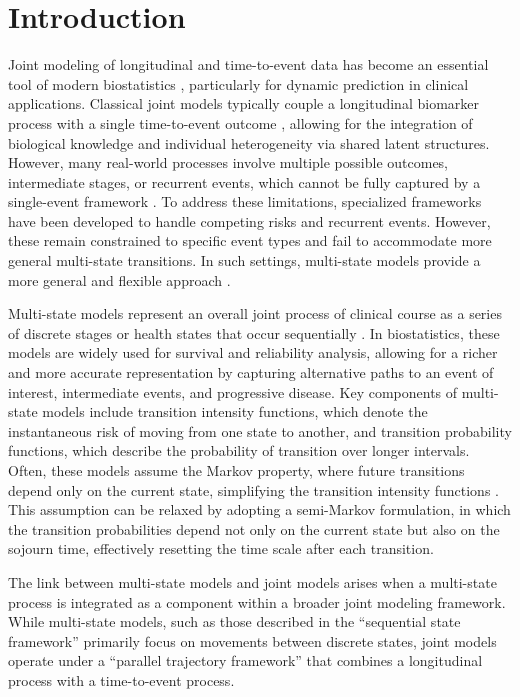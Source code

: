 \documentclass{sn-jnl}
\begin{document}
\section{Introduction} \label{sec:introduction}

Joint modeling of longitudinal and time-to-event data has become an essential tool of modern biostatistics \citep{papageorgiou2019overview}, particularly for dynamic prediction in clinical applications. Classical joint models typically couple a longitudinal biomarker process with a single time-to-event outcome \citep{rizopoulos2012joint}, allowing for the integration of biological knowledge and individual heterogeneity via shared latent structures. However, many real-world processes involve multiple possible outcomes, intermediate stages, or recurrent events, which cannot be fully captured by a single-event framework \citep{KrolMauguen2017}. To address these limitations, specialized frameworks have been developed to handle competing risks and recurrent events. However, these remain constrained to specific event types and fail to accommodate more general multi-state transitions. In such settings, multi-state models provide a more general and flexible approach \citep{ferrer2016joint, you2024joint}.

Multi-state models represent an overall joint process of clinical course as a series of discrete stages or health states that occur sequentially \citep{lovblom2024modeling}. In biostatistics, these models are widely used for survival and reliability analysis, allowing for a richer and more accurate representation by capturing alternative paths to an event of interest, intermediate events, and progressive disease. Key components of multi-state models include transition intensity functions, which denote the instantaneous risk of moving from one state to another, and transition probability functions, which describe the probability of transition over longer intervals. Often, these models assume the Markov property, where future transitions depend only on the current state, simplifying the transition intensity functions \citep{asanjarani2022estimation}. This assumption can be relaxed by adopting a semi-Markov formulation, in which the transition probabilities depend not only on the current state but also on the sojourn time, effectively resetting the time scale after each transition.

The link between multi-state models and joint models arises when a multi-state process is integrated as a component within a broader joint modeling framework. While multi-state models, such as those described in the ``sequential state framework'' primarily focus on movements between discrete states, joint models operate under a ``parallel trajectory framework'' that combines a longitudinal process with a time-to-event process.
\end{document}
